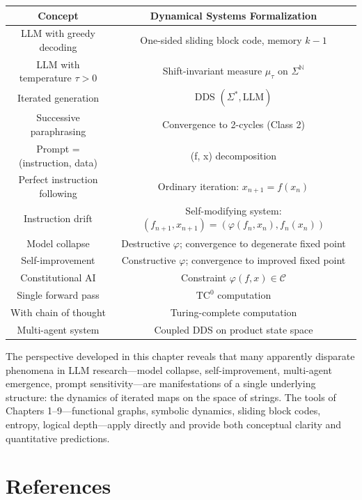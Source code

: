 \begin{center}
\begin{tabular}{cc}
\toprule
Concept & Dynamical Systems Formalization \\
\midrule
LLM with greedy decoding & One-sided sliding block code, memory $k-1$ \\
LLM with temperature $\tau > 0$ & Shift-invariant measure $\mu_\tau$ on $\Sigma^{\mathbb{N}}$ \\
Iterated generation & DDS $(\Sigma^*, \mathrm{LLM})$ \\
Successive paraphrasing & Convergence to 2-cycles (Class 2) \\
Prompt = (instruction, data) & (f, x) decomposition \\
Perfect instruction following & Ordinary iteration: $x_{n+1} = f(x_n)$ \\
Instruction drift & Self-modifying system: $(f_{n+1}, x_{n+1}) = (\varphi(f_n, x_n), f_n(x_n))$ \\
Model collapse & Destructive $\varphi$; convergence to degenerate fixed point \\
Self-improvement & Constructive $\varphi$; convergence to improved fixed point \\
Constitutional AI & Constraint $\varphi(f, x) \in \mathcal{C}$ \\
Single forward pass & $\mathrm{TC}^0$ computation \\
With chain of thought & Turing-complete computation \\
Multi-agent system & Coupled DDS on product state space \\
\bottomrule
\end{tabular}
\end{center}

The perspective developed in this chapter reveals that many apparently disparate phenomena in LLM research---model collapse, self-improvement, multi-agent emergence, prompt sensitivity---are manifestations of a single underlying structure: the dynamics of iterated maps on the space of strings. The tools of Chapters 1--9---functional graphs, symbolic dynamics, sliding block codes, entropy, logical depth---apply directly and provide both conceptual clarity and quantitative predictions.



\section{References}

